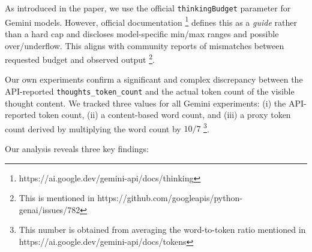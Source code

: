 \documentclass{article} %
\begin{document}
As introduced in the paper, we use the official \texttt{thinkingBudget} parameter for Gemini models. However, official documentation \footnote{https://ai.google.dev/gemini-api/docs/thinking} defines this as a \emph{guide} rather than a hard cap and discloses model-specific min/max ranges and possible over/underflow. This aligns with community reports of mismatches between requested budget and observed output \footnote{This is mentioned in https://github.com/googleapis/python-genai/issues/782}.

Our own experiments confirm a significant and complex discrepancy between the API-reported \texttt{thoughts\_token\_count} and the actual token count of the visible thought content. We tracked three values for all Gemini experiments: (i) the API-reported token count, (ii) a content-based word count, and (iii) a proxy token count derived by multiplying the word count by $10/7$ \footnote{This number is obtained from averaging the word-to-token ratio mentioned in https://ai.google.dev/gemini-api/docs/tokens}.

Our analysis reveals three key findings:
\end{document}
